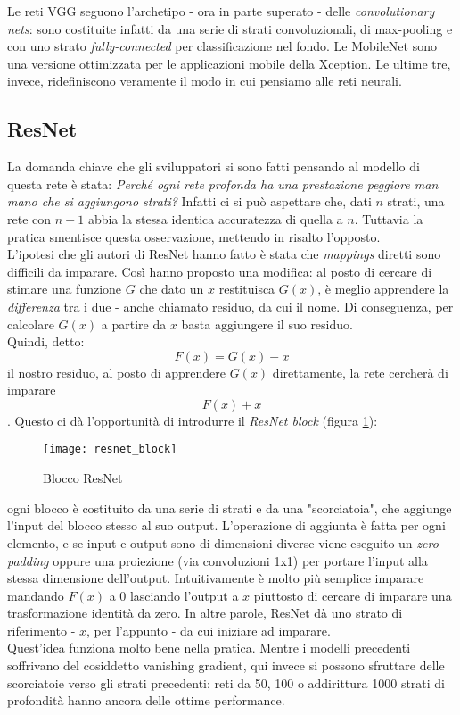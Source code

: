Le reti VGG seguono l'archetipo - ora in parte superato - delle \textit{convolutionary nets}: sono costituite infatti da una serie di strati convoluzionali, di \gls{max-pooling} e con uno strato \textit{fully-connected} per classificazione nel fondo. Le MobileNet sono una versione ottimizzata per le applicazioni mobile della Xception. Le ultime tre, invece, ridefiniscono veramente il modo in cui pensiamo alle reti neurali.
\medskip

\subsection{ResNet}
La domanda chiave che gli sviluppatori si sono fatti pensando al modello di questa rete è stata: \textit{Perché ogni rete profonda ha una prestazione peggiore man mano che si aggiungono strati?}\cite{site:intuitive_guide_DNN_architecture}
Infatti ci si può aspettare che, dati $n$ strati, una rete con $n+1$ abbia la stessa identica accuratezza di quella a $n$. Tuttavia la pratica smentisce questa osservazione, mettendo in risalto l'opposto.
\medskip
\\L'ipotesi che gli autori di ResNet hanno fatto è stata che \textit{mappings} diretti sono difficili da imparare. Così hanno proposto una modifica: al posto di cercare di stimare una funzione $G$ che dato un $x$ restituisca $G(x)$, è meglio apprendere la \textit{differenza} tra i due - anche chiamato residuo, da cui il nome. Di conseguenza, per calcolare $G(x)$ a partire da $x$ basta aggiungere il suo residuo.\\
Quindi, detto:
\[F(x)=G(x)-x\]
il nostro residuo, al posto di apprendere $G(x)$ direttamente, la rete cercherà di imparare
\[F(x)+x\].
Questo ci dà l'opportunità di introdurre il \textit{ResNet block} (figura \ref{img:resnet_block}):
\begin{figure}[!h] 
	\centering 
	\texttt{[image: resnet\_block]} 
	\caption{Blocco ResNet}
	\label{img:resnet_block}
\end{figure}
ogni blocco è costituito da una serie di strati e da una "scorciatoia", che aggiunge l'input del blocco stesso al suo output. L'operazione di aggiunta è fatta per ogni elemento, e se input e output sono di dimensioni diverse viene eseguito un \textit{\gls{zero-padding}} oppure una proiezione (via \gls{convoluzioni} 1x1) per portare l'input alla stessa dimensione dell'output. Intuitivamente è molto più semplice imparare mandando $F(x)$ a 0 lasciando l'output a $x$ piuttosto di cercare di imparare una trasformazione identità da zero. In altre parole, ResNet dà uno strato di riferimento - $x$, per l'appunto - da cui iniziare ad imparare.
\medskip
\\Quest'idea funziona molto bene nella pratica. Mentre i modelli precedenti soffrivano del cosiddetto \gls{vanishing gradient}, qui invece si possono sfruttare delle scorciatoie verso gli strati precedenti: reti da 50, 100 o addirittura 1000 strati di profondità hanno ancora delle ottime performance.

